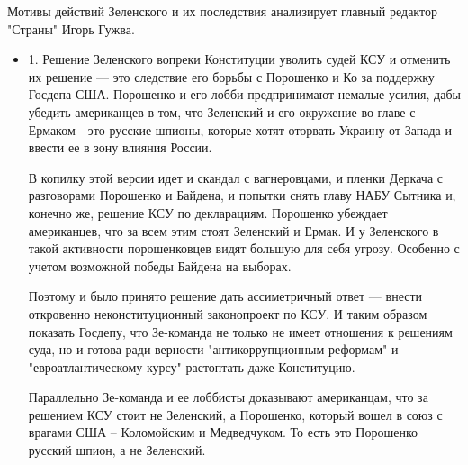Мотивы действий Зеленского и их последствия анализирует главный редактор
"Страны" Игорь Гужва.

\begin{itemize}
	
\item 1. Решение Зеленского вопреки Конституции уволить судей КСУ и отменить их
				решение --- это следствие его борьбы с Порошенко и Ко за поддержку
				Госдепа США.  Порошенко и его лобби предпринимают немалые усилия, дабы
				убедить американцев в том, что Зеленский и его окружение во главе с
				Ермаком - это русские шпионы, которые хотят оторвать Украину от Запада
				и ввести ее в зону влияния России.

В копилку этой версии идет и скандал с вагнеровцами, и пленки Деркача с
разговорами Порошенко и Байдена, и попытки снять главу НАБУ Сытника и, конечно
же, решение КСУ по декларациям. Порошенко убеждает американцев, что за всем
этим стоят Зеленский и Ермак. И у Зеленского в такой активности порошенковцев
видят большую для себя угрозу. Особенно с учетом возможной победы Байдена на
выборах.

Поэтому и было принято решение дать ассиметричный ответ --- внести откровенно
неконституционный законопроект по КСУ. И таким образом показать Госдепу, что
Зе-команда не только не имеет отношения к решениям суда, но и готова ради
верности "антикоррупционным реформам" и "евроатлантическому курсу" растоптать
даже Конституцию.

Параллельно Зе-команда и ее лоббисты доказывают американцам, что за решением
КСУ стоит не Зеленский, а Порошенко, который вошел в союз с врагами США –
Коломойским и Медведчуком. То есть это Порошенко русский шпион, а не Зеленский.


\end{itemize}
